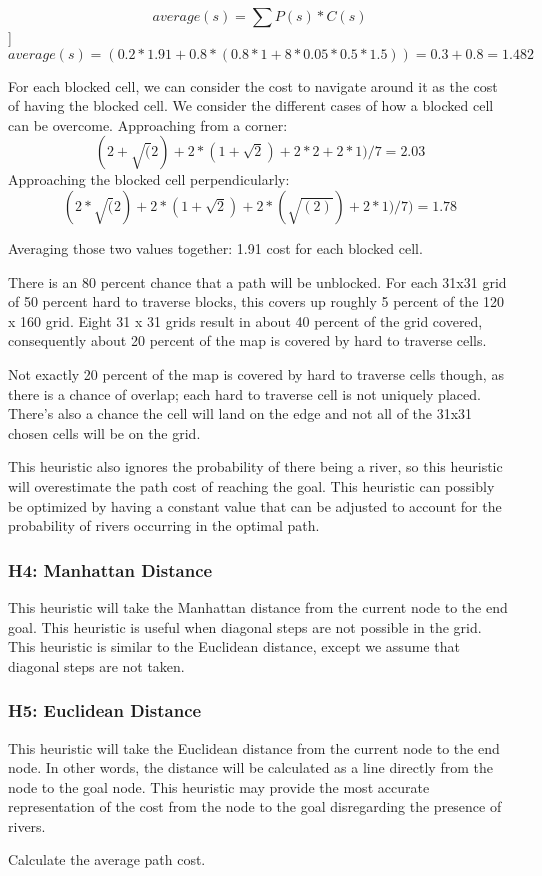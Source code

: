 \[average(s) = \sum{P(s)*C(s)}  \]]
\[average(s) = (0.2 * 1.91 + 0.8 * ( 0.8 * 1 + 8*0.05*0.5*1.5 ) ) = 0.3 + 0.8 = 1.482\]

For each blocked cell, we can consider the cost to navigate around it as the cost of having the blocked cell. We consider the different cases of how a blocked cell can be overcome. 
Approaching from a corner: \[(2 + \sqrt(2) + 2 * ( 1 + \sqrt{2}) + 2 * 2 + 2 * 1) / 7  = 2.03\]
Approaching the blocked cell perpendicularly: \[ (2*\sqrt(2) + 2*(1 + \sqrt{2}) + 2 * (\sqrt{(2)}) + 2*1 )/ 7 ) = 1.78 \]

Averaging those two values together: 1.91 cost for each blocked cell.

There is an 80 percent chance that a path will be unblocked.
For each 31x31 grid of 50 percent hard to traverse blocks, this covers up roughly 5 percent of the 120 x 160 grid. Eight 31 x 31 grids result in about 40 percent of the grid covered, consequently about 20 percent of the map is covered by hard to traverse cells.

Not exactly 20 percent of the map is covered by hard to traverse cells though, as there is a chance of overlap; each hard to traverse cell is not uniquely placed. There's also a chance the cell will land on the edge and not all of the 31x31 chosen cells will be on the grid.

This heuristic also ignores the probability of there being a river, so this heuristic will overestimate the path cost of reaching the goal. This heuristic can possibly be optimized by having a constant value that can be adjusted to account for the probability of rivers occurring in the optimal path.

\subsubsection{H4: Manhattan Distance}
This heuristic will take the Manhattan distance from the current node to the end goal. This heuristic is useful when diagonal steps are not possible in the grid. This heuristic is similar to the Euclidean distance, except we assume that diagonal steps are not taken.

\subsubsection{H5: Euclidean Distance}
This heuristic will take the Euclidean distance from the current node to the end node. In other words, the distance will be calculated as a line directly from the node to the goal node. This heuristic may provide the most accurate representation of the cost from the node to the goal disregarding the presence of rivers.

Calculate the average path cost.